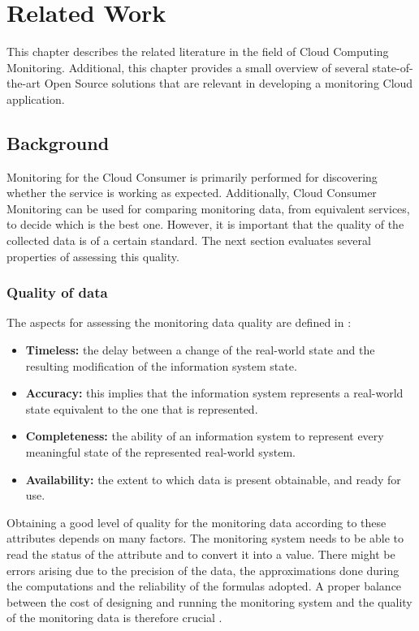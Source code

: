\chapter{Related Work}\label{ch:related_work}
This chapter describes the related literature in the field of Cloud Computing Monitoring. Additional, this chapter provides a small overview of several state-of-the-art Open Source solutions that are relevant in developing a monitoring Cloud application.

\section{Background} \label{sec:background}
Monitoring for the Cloud Consumer is primarily performed for discovering whether the service is working as expected. Additionally, Cloud Consumer Monitoring can be used for comparing monitoring data, from equivalent services, to decide which is the best one. However, it is important that the quality of the collected data is of a certain standard. The next section evaluates several properties of assessing this quality.

\subsection{Quality of data} \label{sec:quality}
The aspects for assessing the monitoring data quality are defined in \cite{wand1996anchoring}:
\begin{itemize}
    \item \textbf{Timeless: }the delay between a change of the real-world state and the resulting modification of the information system state.
    \item \textbf{Accuracy: }this implies that the information system represents a real-world state equivalent to the one that is represented.
    \item \textbf{Completeness: }the ability of an information system to represent every meaningful state of the represented real-world system.
    \item \textbf{Availability: }the extent to which data is present obtainable, and ready for use.
\end{itemize}

\noindent
Obtaining a good level of quality for the monitoring data according to these attributes depends on many factors. The monitoring system needs to be able to read the status of the attribute and to convert it into a value. There might be errors arising due to the precision of the data, the approximations done during the computations and the reliability of the formulas adopted. A proper balance between the cost of designing and running the monitoring system and the quality of the monitoring data is therefore crucial \cite{pernici2016monitoring}. 


